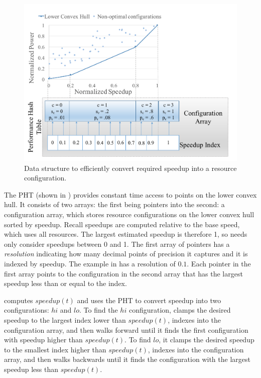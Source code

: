 \begin{figure}
\includegraphics[width=\columnwidth]{figures/performance-hash-table.pdf}
\caption{Data structure to efficiently convert required speedup into a
  resource configuration.}
  \label{fig:pht}
\end{figure}

The PHT (shown in ) provides constant time access to
points on the lower convex hull.  It consists of two arrays: the first
being pointers into the second: a configuration array, which stores
resource configurations on the lower convex hull sorted by speedup.
Recall speedups are computed relative to the base speed, which uses
all resources.  The largest estimated speedup is therefore 1, so
\SYSTEM{} needs only consider speedups between 0 and 1.  The first
array of pointers has a \emph{resolution} indicating how many decimal
points of precision it captures and it is indexed by speedup.  The
example in  has a resolution of $0.1$.  Each pointer
in the first array points to the configuration in the second array
that has the largest speedup less than or equal to the index.

\SYSTEM{} computes $speedup(t)$ and uses the PHT to convert speedup
into two configurations: $hi$ and $lo$.  To find the $hi$
configuration, \SYSTEM{} clamps the desired speedup to the largest
index lower than $speedup(t)$, indexes into the configuration array,
and then walks forward until it finds the first configuration with
speedup higher than $speedup(t)$.  To find $lo$, it clamps the desired
speedup to the smallest index higher than $speedup(t)$, indexes into
the configuration array, and then walks backwards until it finds the
configuration with the largest speedup less than $speedup(t)$.

